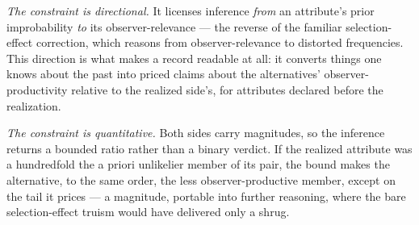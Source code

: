 \documentclass[11pt]{article}
\theoremstyle{definition}
\begin{document}
\emph{The constraint is directional.} It licenses inference \emph{from} an attribute's prior improbability \emph{to} its observer-relevance --- the reverse of the familiar selection-effect correction, which reasons from observer-relevance to distorted frequencies. This direction is what makes a record readable at all: it converts things one knows about the past into priced claims about the alternatives' observer-productivity relative to the realized side's, for attributes declared before the realization.

\emph{The constraint is quantitative.} Both sides carry magnitudes, so the inference returns a bounded ratio rather than a binary verdict. If the realized attribute was a hundredfold the a priori unlikelier member of its pair, the bound makes the alternative, to the same order, the less observer-productive member, except on the tail it prices --- a magnitude, portable into further reasoning, where the bare selection-effect truism would have delivered only a shrug.
\end{document}
